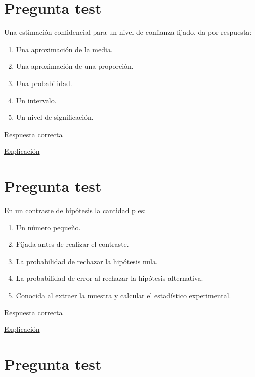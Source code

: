 \documentclass[
]{book}
\providecommand{\tightlist}{%
  \setlength{\itemsep}{0pt}\setlength{\parskip}{0pt}}
\begin{document}
\hypertarget{pregunta-test-97}{%
\section{Pregunta test}\label{pregunta-test-97}}

Una estimación confidencial para un nivel de confianza fijado, da por respuesta:

\begin{enumerate}
\def\labelenumi{\alph{enumi})}
\tightlist
\item
  Una aproximación de la media.
\item
  Una aproximación de una proporción.
\item
  Una probabilidad.
\item
  Un intervalo.
\item
  Un nivel de significación.
\end{enumerate}

Respuesta correcta

\href{https://1fjmanzano.github.io/bioestadistica/estimacio\%CC\%81n-de-para\%CC\%81metros.-intervalos-de-confianza.html}{Explicación}

\hypertarget{pregunta-test-98}{%
\section{Pregunta test}\label{pregunta-test-98}}

En un contraste de hipótesis la cantidad p es:

\begin{enumerate}
\def\labelenumi{\alph{enumi})}
\tightlist
\item
  Un número pequeño.
\item
  Fijada antes de realizar el contraste.
\item
  La probabilidad de rechazar la hipótesis nula.
\item
  La probabilidad de error al rechazar la hipótesis alternativa.
\item
  Conocida al extraer la muestra y calcular el estadístico experimental.
\end{enumerate}

Respuesta correcta

\href{https://1fjmanzano.github.io/bioestadistica/valor-p.html}{Explicación}

\hypertarget{pregunta-test-99}{%
\section{Pregunta test}\label{pregunta-test-99}}
\end{document}
